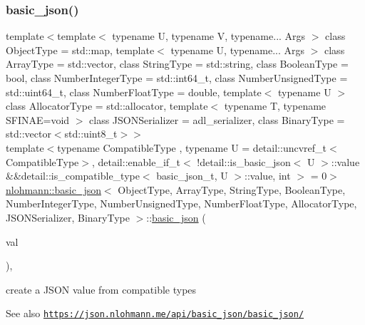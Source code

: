 \subsubsection{\texorpdfstring{basic\+\_\+json()}{basic\_json()}\hspace{0.1cm}{\footnotesize\ttfamily [3/9]}}
{\footnotesize\ttfamily template$<$template$<$ typename U, typename V, typename... Args $>$ class Object\+Type = std\+::map, template$<$ typename U, typename... Args $>$ class Array\+Type = std\+::vector, class String\+Type  = std\+::string, class Boolean\+Type  = bool, class Number\+Integer\+Type  = std\+::int64\+\_\+t, class Number\+Unsigned\+Type  = std\+::uint64\+\_\+t, class Number\+Float\+Type  = double, template$<$ typename U $>$ class Allocator\+Type = std\+::allocator, template$<$ typename T, typename S\+F\+I\+N\+A\+E=void $>$ class J\+S\+O\+N\+Serializer = adl\+\_\+serializer, class Binary\+Type  = std\+::vector$<$std\+::uint8\+\_\+t$>$$>$ \\
template$<$typename Compatible\+Type , typename U  = detail\+::uncvref\+\_\+t$<$\+Compatible\+Type$>$, detail\+::enable\+\_\+if\+\_\+t$<$ !detail\+::is\+\_\+basic\+\_\+json$<$ U $>$\+::value \&\&detail\+::is\+\_\+compatible\+\_\+type$<$ basic\+\_\+json\+\_\+t, U $>$\+::value, int $>$  = 0$>$ \\
\hyperlink{classnlohmann_1_1basic__json}{nlohmann\+::basic\+\_\+json}$<$ Object\+Type, Array\+Type, String\+Type, Boolean\+Type, Number\+Integer\+Type, Number\+Unsigned\+Type, Number\+Float\+Type, Allocator\+Type, J\+S\+O\+N\+Serializer, Binary\+Type $>$\+::\hyperlink{classnlohmann_1_1basic__json}{basic\+\_\+json} (\begin{DoxyParamCaption}\item[{Compatible\+Type \&\&}]{val }\end{DoxyParamCaption})\hspace{0.3cm}{\ttfamily [inline]}, {\ttfamily [noexcept]}}



create a J\+S\+ON value from compatible types 

\begin{DoxySeeAlso}{See also}
\href{https://json.nlohmann.me/api/basic_json/basic_json/}{\tt https\+://json.\+nlohmann.\+me/api/basic\+\_\+json/basic\+\_\+json/} 
\end{DoxySeeAlso}
\mbox{\label{classnlohmann_1_1basic__json_a40738eb9cb8c5a9ca14ae4b697c29f8e}} 
